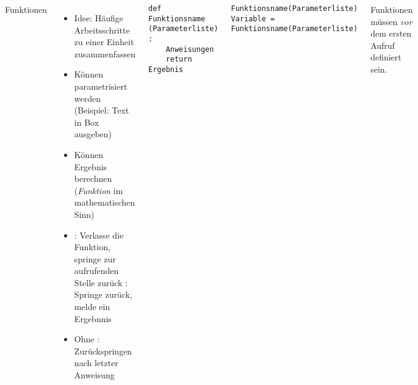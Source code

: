 
\begin{frame}[fragile]
%
\begin{columns}[T]
\begin{Large}
{Funktionen}
\vspace{6pt}
\end{Large}
\begin{itemize}
\item Idee: Häufige Arbeitsschritte zu einer Einheit zusammenfassen
\item Können parametrisiert werden (Beispiel: Text in Box ausgeben)
\item Können Ergebnis berechnen (\Thus \emph{Funktion} im mathematischen Sinn)
\item {}: Verlasse die Funktion, springe zur aufrufenden Stelle zurück
: Springe zurück, melde ein Ergebnnis
\item Ohne : Zurückspringen nach letzter Anweisung
\end{itemize}
%
\begin{codebox}
\begin{verbatim}
def Funktionsname (Parameterliste) :
    Anweisungen
    return Ergebnis
\end{verbatim}
\end{codebox}
%
\begin{codebox}
\begin{verbatim}
Funktionsname(Parameterliste)
Variable = Funktionsname(Parameterliste)
\end{verbatim}
\end{codebox}
%
\begin{hintbox}[Reihenfolge]
Funktionen müssen \emph{vor} dem ersten Aufruf definiert sein.
\end{hintbox}
\end{columns}
%
\end{frame}


